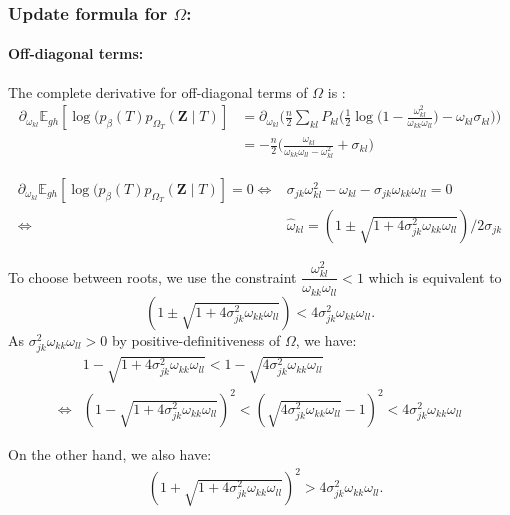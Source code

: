 \documentclass[11pt,a4paper]{article}
\newcommand{\Zbf}{\boldsymbol{Z}}
\newcommand{\Esp}{\mathds{E}}
\begin{document}
\subsubsection{Update formula for $\Omega$:}
  
\paragraph{Off-diagonal terms:\\}

 The complete derivative for off-diagonal terms of $\Omega$ is :
\begin{align*}
 \partial_{\omega_{kl}}\Esp_{gh} [\log (p_\beta(T)p_{\Omega_T}(\Zbf\mid T) ] &= \partial_{\omega_{kl}}\Big(\frac{n}{2} \sum_{kl} P_{kl} \Big( \frac{1}{2} \log \big(1 - \frac{\omega_{kl}^2}{\omega_{kk} \omega_{ll}}\big) -\omega_{kl} \sigma_{kl} \Big) \Big)\\
 &= -\frac{n}{2} \Big( \frac{\omega_{kl}}{\omega_{kk} \omega_{ll} - \omega_{kl}^2} + \sigma_{kl}\Big)
 \end{align*}
 
 \begin{align*}
  \partial_{\omega_{kl}}\Esp_{gh} [\log (p_\beta(T)p_{\Omega_T}(\Zbf\mid T) ] = 0 \iff & {\sigma}_{jk} \omega_{kl}^2 - \omega_{kl} - {\sigma}_{jk} \omega_{kk}\omega_{ll} = 0 \\
 \iff & \widehat{\omega}_{kl} = (1 \pm \sqrt{1+4{\sigma}_{jk}^2 \omega_{kk}\omega_{ll}}) / 2{\sigma}_{jk}
\end{align*}

To choose between roots, we use the constraint $\dfrac{\omega_{kl}^2}{\omega_{kk}\omega_{ll}} < 1$ which is equivalent to 
$$ (1 \pm \sqrt{1+4{\sigma}_{jk}^2 \omega_{kk}\omega_{ll}}) < 4{\sigma}_{jk}^2 \omega_{kk}\omega_{ll}.$$
As ${\sigma}_{jk}^2 \omega_{kk}\omega_{ll} > 0$ by positive-definitiveness of $\Omega$, we have:
\begin{align*}
&1 - \sqrt{1+4{\sigma}_{jk}^2 \omega_{kk}\omega_{ll}} < 1- \sqrt{4{\sigma}_{jk}^2 \omega_{kk}\omega_{ll}}\\
\iff &(1 - \sqrt{1+4{\sigma}_{jk}^2 \omega_{kk}\omega_{ll}})^2 < ( \sqrt{4{\sigma}_{jk}^2 \omega_{kk}\omega_{ll}}-1)^2 < 4{\sigma}_{jk}^2 \omega_{kk}\omega_{ll}
\end{align*}

On the other hand, we also have:
\begin{align*}
&(1 + \sqrt{1+4{\sigma}_{jk}^2 \omega_{kk}\omega_{ll}})^2 >4{\sigma}_{jk}^2 \omega_{kk}\omega_{ll}.
\end{align*}
\end{document}
